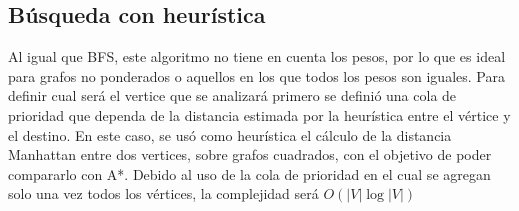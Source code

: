 \documentclass[a4paper,10pt]{article}
\begin{document}
\subsection{Búsqueda con heurística}

Al igual que BFS, este algoritmo no tiene en cuenta los pesos, por lo que es ideal para grafos no ponderados o aquellos en los que todos los pesos son iguales. Para definir cual será el vertice que se analizará primero se definió una cola de prioridad que dependa de la distancia estimada por la heurística entre el vértice y el destino. En este caso, se usó como heurística el cálculo de la distancia Manhattan entre dos vertices, sobre grafos cuadrados, con el objetivo de poder compararlo con A*. Debido al uso de la cola de prioridad en el cual se agregan solo una vez todos los vértices, la complejidad será $O(|V| \log{|V|})$
\end{document}
